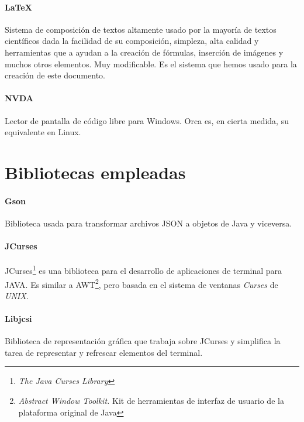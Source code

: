 \paragraph{\LaTeX} Sistema de composición de textos altamente usado por la mayoría de textos científicos dada la facilidad de su composición, simpleza, alta calidad y herramientas que a ayudan a la creación de fórmulas, inserción de imágenes y muchos otros elementos. Muy modificable. Es el sistema que hemos usado para la creación de este documento.

\paragraph{NVDA} Lector de pantalla de código libre para Windows. Orca es, en cierta medida, su equivalente en Linux.

\section{Bibliotecas empleadas}

\paragraph{Gson} Biblioteca usada para transformar archivos JSON a objetos de Java y viceversa.

\paragraph{JCurses} JCurses\footnote{\textit{The Java Curses Library}} es una biblioteca para el desarrollo de aplicaciones de terminal para JAVA. Es similar a AWT\footnote{\textit{Abstract Window Toolkit.} Kit de herramientas de interfaz de usuario de la plataforma original de Java}, pero basada en el sistema de ventanas \textit{Curses} de \textit{UNIX}.

\paragraph{Libjcsi} Biblioteca de representación gráfica que trabaja sobre JCurses y simplifica la tarea de representar y refrescar elementos del terminal.
